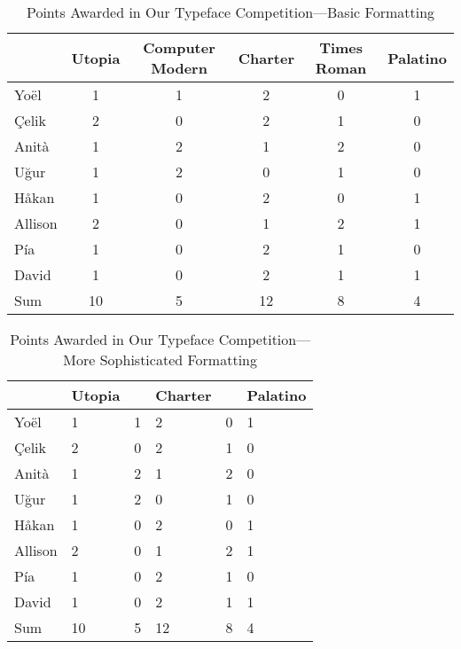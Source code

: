 


\begin{table}[t]
	\caption{Points Awarded in Our Typeface Competition---Basic Formatting}
	\label{tab:basic_formatting}
	\begin{tabular}{@{}lccccc@{}}
		\toprule
					&	Utopia	&	Computer Modern	&	Charter	&	Times Roman	&	Palatino	\\
		\midrule
		Yo\"{e}l	&	1	&	1	&	2	&	0	&	1	\\
		\c{C}elik	&	2	&	0	&	2	&	1	&	0	\\
		Anit\`{a}	&	1	&	2	&	1	&	2	&	0	\\
		U\u{g}ur	&	1	&	2	&	0	&	1	&	0	\\
		H\r{a}kan	&	1	&	0	&	2	&	0	&	1	\\
		Allison		&	2	&	0	&	1	&	2	&	1	\\
		P\'{i}a		&	1	&	0	&	2	&	1	&	0	\\
		David		&	1	&	0	&	2	&	1	&	1	\\
		\midrule
		Sum			&  10	&	5	&	12	&	8	&	4	\\
		\bottomrule
	\end{tabular}
\end{table}

\begin{table}[b]
	\caption{Points Awarded in Our Typeface Competition---More Sophisticated Formatting}
	\label{tab:advanced_formatting}
	\renewcommand\cellalign{ct}
	\begin{tabularx}{\textwidth}{ @{} L *{5}{T{2.0}} }
		\toprule
			&	{Utopia}
			&	{}
			&	{Charter}
			&	{}
			&	{Palatino}
			\\
		\midrule
		Yo\"{e}l  	& 	1	&	1	&	2	&	0	&	1	\\
		\c{C}elik	&	2	&	0	&	2	&	1	&	0	\\
		Anit\`{a}	&	1	&	2	&	1	&	2	&	0	\\
		U\u{g}ur	&	1	&	2	&	0	&	1	&	0	\\
		H\r{a}kan	&	1	&	0	&	2	&	0	&	1	\\
		Allison		&	2	&	0	&	1	&	2	&	1	\\
		P\'ia		&	1	&	0	&	2	&	1	&	0	\\
		David		&	1	&	0	&	2	&	1	&	1	\\
		\midrule
		Sum			&  10	&	5	&	12	&	8	&	4	\\
		\bottomrule
	\end{tabularx}
	\parnotes%
\end{table}